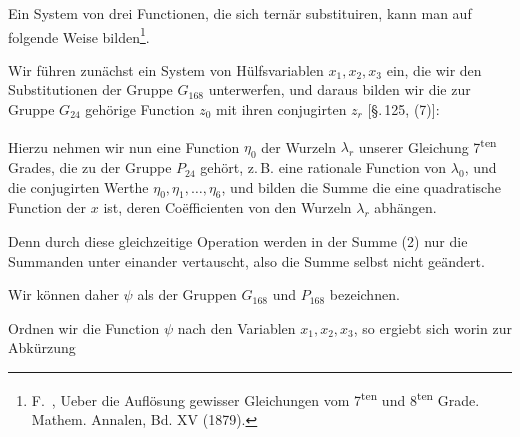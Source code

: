 
Ein System von drei Functionen, die sich ternär substituiren, kann man auf folgende Weise bilden\footnote{F.\ , \glqq Ueber die Auflösung gewisser Gleichungen vom 7\textsuperscript{ten} und 8\textsuperscript{ten} Grade\grqq. Mathem. Annalen, Bd. XV (1879).}.

Wir führen zunächst ein System von Hülfsvariablen $x_1, x_2, x_3$ ein, die wir den Substitutionen der Gruppe $G_{168}$ unterwerfen, und daraus bilden wir die zur Gruppe $G_{24}$ gehörige Function $z_0$ mit ihren conjugirten $z_r$ [\S.\,125, (7)]:

Hierzu nehmen wir nun eine Function $\eta_0$ der Wurzeln $\lambda_r$ unserer Gleichung 7\textsuperscript{ten} Grades, die zu der Gruppe $P_{24}$ gehört, z.\,B. eine rationale Function von $\lambda_0$, und die conjugirten Werthe $\eta_0, \eta_1, \ldots, \eta_6$, und bilden die Summe
die eine quadratische Function der $x$ ist, deren Coëfficienten von den Wurzeln $\lambda_r$ abhängen.

 Denn durch diese gleichzeitige Operation werden in der Summe (2) nur die Summanden unter einander vertauscht, also die Summe selbst nicht geändert.

Wir können daher $\psi$ als  der Gruppen $G_{168}$ und $P_{168}$ bezeichnen.

Ordnen wir die Function $\psi$ nach den Variablen $x_1, x_2, x_3$, so ergiebt sich
worin zur Abkürzung
